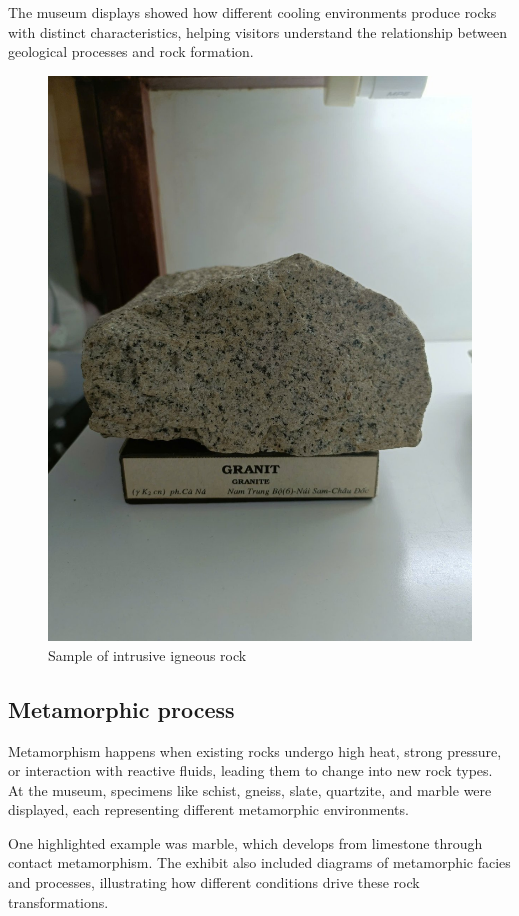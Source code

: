 The museum displays showed how different cooling environments produce rocks with distinct characteristics, helping visitors understand the relationship between geological processes and rock formation.

\begin{figure}[H]
  \centering
  \includegraphics[max width=0.8\linewidth]{graphics/figure_07.jpg}
  \caption{Sample of intrusive igneous rock}
  \label{fig:intrusive-igneous}
\end{figure}

\subsection{Metamorphic process}
\label{subsec:metamorphic-process}

Metamorphism happens when existing rocks undergo high heat, strong pressure, or interaction with reactive fluids, leading them to change into new rock types. At the museum, specimens like schist, gneiss, slate, quartzite, and marble were displayed, each representing different metamorphic environments.

One highlighted example was marble, which develops from limestone through contact metamorphism. The exhibit also included diagrams of metamorphic facies and processes, illustrating how different conditions drive these rock transformations.

